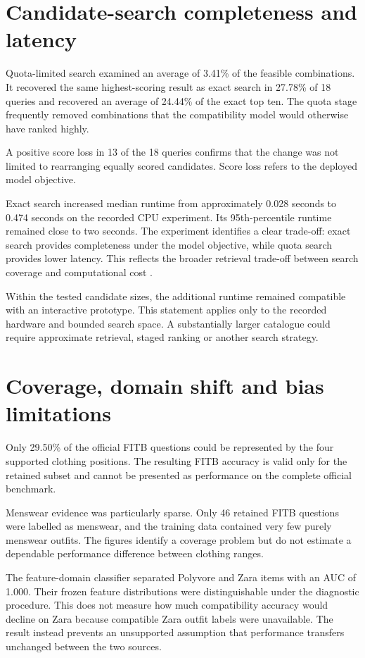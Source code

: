 \section{Candidate-search completeness and latency}

Quota-limited search examined an average of 3.41\% of the feasible combinations.
It recovered the same highest-scoring result as exact search in 27.78\% of 18
queries and recovered an average of 24.44\% of the exact top ten. The quota
stage frequently removed combinations that the compatibility model
would otherwise have ranked highly.

A positive score loss in 13 of the 18 queries confirms that the change was not
limited to rearranging equally scored candidates. Score loss refers to the
deployed model objective.

Exact search increased median runtime from approximately 0.028 seconds to 0.474
seconds on the recorded CPU experiment. Its 95th-percentile runtime remained
close to two seconds. The experiment identifies a clear trade-off: exact search
provides completeness under the model objective, while quota search provides
lower latency. This reflects the broader retrieval trade-off between search
coverage and computational cost \parencite{johnson2021similarity}.

Within the tested candidate sizes, the additional runtime remained compatible
with an interactive prototype. This statement applies only to the recorded
hardware and bounded search space. A substantially larger catalogue could
require approximate retrieval, staged ranking or another search strategy.

\section{Coverage, domain shift and bias limitations}

Only 29.50\% of the official FITB questions could be represented by the four
supported clothing positions. The resulting FITB accuracy is valid only for the
retained subset and cannot be presented as performance on the complete official
benchmark.

Menswear evidence was particularly sparse. Only 46 retained FITB questions
were labelled as menswear, and the training data contained very few purely
menswear outfits. The figures identify a coverage problem but do not estimate a
dependable performance difference between clothing ranges.

The feature-domain classifier separated Polyvore and Zara items with an AUC of
1.000. Their frozen feature distributions were distinguishable under
the diagnostic procedure. This does not measure how much compatibility accuracy
would decline on Zara because compatible Zara outfit labels were unavailable.
The result instead prevents an unsupported assumption that performance transfers
unchanged between the two sources.

